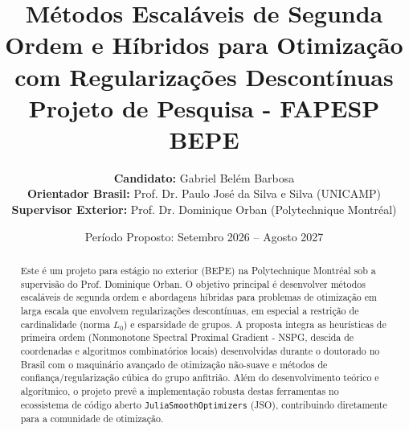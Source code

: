 \documentclass[11pt,a4paper]{article}
\title{\textbf{Métodos Escaláveis de Segunda Ordem e Híbridos para Otimização com Regularizações Descontínuas}\\
\large Projeto de Pesquisa - FAPESP BEPE}
\author{
    \textbf{Candidato:} Gabriel Belém Barbosa \\
    \textbf{Orientador Brasil:} Prof. Dr. Paulo José da Silva e Silva (UNICAMP) \\
    \textbf{Supervisor Exterior:} Prof. Dr. Dominique Orban (Polytechnique Montréal)
}
\date{Período Proposto: Setembro 2026 -- Agosto 2027}
\begin{document}
\maketitle

\begin{abstract}
Este é um projeto para estágio no exterior (BEPE) na Polytechnique Montréal sob a supervisão do Prof. Dominique Orban. O objetivo principal é desenvolver métodos escaláveis de segunda ordem e abordagens híbridas para problemas de otimização em larga escala que envolvem regularizações descontínuas, em especial a restrição de cardinalidade (norma $L_0$) e esparsidade de grupos. A proposta integra as heurísticas de primeira ordem (Nonmonotone Spectral Proximal Gradient - NSPG, descida de coordenadas e algoritmos combinatórios locais) desenvolvidas durante o doutorado no Brasil com o maquinário avançado de otimização não-suave e métodos de confiança/regularização cúbica do grupo anfitrião. Além do desenvolvimento teórico e algorítmico, o projeto prevê a implementação robusta destas ferramentas no ecossistema de código aberto \texttt{JuliaSmoothOptimizers} (JSO), contribuindo diretamente para a comunidade de otimização.
\end{abstract}

\tableofcontents
\newpage








\end{document}
